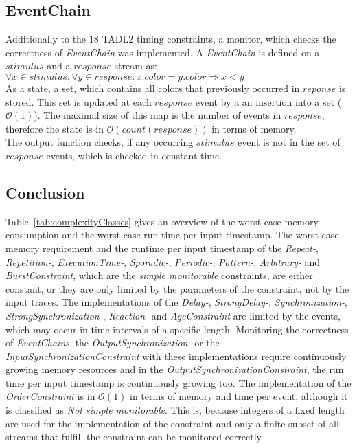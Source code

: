 \subsection{EventChain}
	Additionally to the 18 TADL2 timing constraints, a monitor, which checks the correctness of \textit{EventChain} was implemented. A \textit{EventChain} is defined on a $stimulus$ and a $response$ stream as:\\[10pt]
	$\forall x \in stimulus:\forall y\in response: x.color=y.color\Rightarrow x<y$\\[10pt]
	As a state, a set, which contains all colors that previously occurred in $reponse$ is stored. This set is updated at each $response$  event by a an insertion into a set ($\mathcal{O}(1)$). The maximal size of this map is the number of events in $response$, therefore the state is in $\mathcal{O}(count(response))$ in terms of memory.\\
	The output function checks, if any occurring $stimulus$ event is not in the set of $response$ events, which is checked in constant time.
	
\subsection{Conclusion}
Table~\ref{tab:complexityClasses} gives an overview of the worst case memory consumption and the worst case run time per input timestamp. The worst case memory requirement and the runtime per input timestamp of the \textit{Repeat-}, \textit{Repetition-}, \textit{ExecutionTime-}, \textit{Sporadic-}, \textit{Periodic-}, \textit{Pattern-}, \textit{Arbitrary-} and \textit{BurstConstraint}, which are the \textit{simple monitorable} constraints, are either constant, or they are only limited by the parameters of the constraint, not by the input traces. The implementations of the \textit{Delay-}, \textit{StrongDelay-}, \textit{Synchronization-}, \textit{StrongSynchronization-}, \textit{Reaction-} and \textit{AgeConstraint} are limited by the events, which may occur in time intervals of a specific length. Monitoring the correctness of \textit{EventChains}, the \textit{OutputSynchronization-} or the \textit{InputSynchronizationConstraint} with these implementations require continuously growing memory resources and in the \textit{OutputSynchronizationConstraint}, the run time per input timestamp is continuously growing too. The implementation of the \textit{OrderConstraint} is in $\mathcal{O}(1)$ in terms of memory and time per event, although it is classified as \textit{Not simple monitorable}. This is, because integers of a fixed length are used for the implementation of the constraint and only a finite subset of all streams that fulfill the constraint can be monitored correctly.

